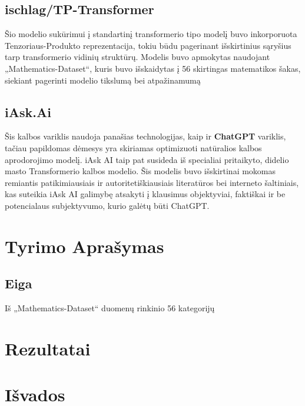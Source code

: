 \documentclass[conference]{IEEEtran}
\begin{document}
\subsection{ischlag/TP-Transformer}
Šio modelio sukūrimui į standartinį transformerio tipo modelį buvo inkorporuota Tenzoriaus-Produkto
reprezentacija, tokiu būdu pagerinant išskirtinius sąryšius tarp transformerio vidinių struktūrų. Modelis buvo apmokytas
naudojant „Mathematics-Dataset“, kuris buvo išskaidytas į 56 skirtingas matematikos šakas, siekiant
pagerinti modelio tikslumą bei atpažinamumą

\subsection{iAsk.Ai}
Šis kalbos variklis naudoja panašias technologijas, kaip ir \textbf{ChatGPT} variklis, tačiau
papildomas dėmesys yra skiriamas optimizuoti natūralios kalbos aprodorojimo modelį. iAsk AI taip pat susideda iš specialiai pritaikyto,
didelio masto Transformerio kalbos modelio. Šis modelis buvo išskirtinai mokomas remiantis
patikimiausiais ir autoritetiškiausiais literatūros bei interneto šaltiniais,
kas suteikia iAsk AI galimybę atsakyti į klausimus objektyviai,
faktiškai ir be potencialaus subjektyvumo, kurio galėtų būti ChatGPT.


\section{Tyrimo Aprašymas}

\subsection{Eiga}
Iš „Mathematics-Dataset“ duomenų rinkinio 56 kategorijų
\section{Rezultatai}

\section{Išvados}





\end{document}
